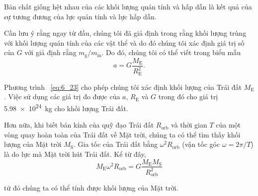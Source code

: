 Bản chất giống hệt nhau của các khối lượng quán tính và hấp dẫn là kết quả của sự tương đương của lực quán tính và lực hấp dẫn.

Cần lưu ý rằng ngay từ đầu, chúng tôi đã giả định trong  rằng khối lượng trùng với khối lượng quán tính của các vật thể và do đó chúng tôi xác định giá trị số của $G$ với giả định rằng $m_{\text{g}}/m_{\text{in}}$. Do đó, chúng tôi có thể viết  trong biểu mẫu
\begin{equation}\label{eq:6_23}
	a = G\frac{M_{\text{E}}}{R_{\text{E}}^2}.
\end{equation}

\noindent
Phương trình ~\eqref{eq:6_23} cho phép chúng tôi xác định khối lượng của Trái đất $M_{\text{E}}$. Việc sử dụng các giá trị đo được của $a$, $R_{\text{E}}$ và $G$ trong đó cho giá trị \SI{5.98e24}{\kilo\gram} cho khối lượng Trái đất.

Hơn nữa, khi biết bán kính của quỹ đạo Trái đất $R_{\text{orb}}$ và thời gian $T$ của một vòng quay hoàn toàn của Trái đất về Mặt trời, chúng ta có thể tìm thấy khối lượng của Mặt trời $M_{\text{S}}$. Gia tốc của Trái đất bằng $\omega^2R_{\text{orb}}$ (vận tốc góc $\omega=2\pi/T$) là do lực mà Mặt trời hút Trái đất. Kể từ đây,
\begin{equation*}
	M_{\text{E}}\omega^2R_{\text{orb}} = G\frac{M_{\text{E}}M_{\text{S}}}{R_{\text{orb}}^2}
\end{equation*}

\noindent
từ đó chúng ta có thể tính được khối lượng của Mặt trời.

